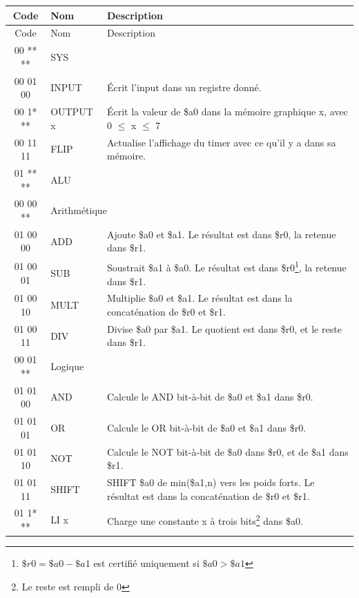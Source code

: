 \documentclass{article}
\begin{document}
\begin{savenotes}
\begin{longtable}{|c|l|l|}
  
  \hline
  Code & Nom & Description \\
  \endfirsthead
  \hline
  Code & Nom & Description \\
  \hline\hline
  \endhead

  \hline\hline
  00 ** ** & \multicolumn{2}{|l|}{SYS} \\
  \hline
  00 01 00 & INPUT    & \'Ecrit l'input dans un registre donné. \\
  00 1* ** & OUTPUT x & \'Ecrit la valeur de \$a0 dans la mémoire graphique x, avec 0 $\leq$ x $\leq$ 7 \\
  00 11 11 & FLIP     & Actualise l'affichage du timer avec ce qu'il y a dans sa mémoire. \\
  
  \hline\hline
  01 ** ** & \multicolumn{2}{|l|}{ALU} \\
  \hline
  00 00 ** & \multicolumn{2}{|l|}{Arithmétique} \\
  \hline
  01 00 00 & ADD   & Ajoute \$a0 et \$a1. Le résultat est dans \$r0, la retenue dans \$r1. \\
  01 00 01 & SUB   & Soustrait \$a1 à \$a0. Le résultat est dans \$r0\footnote{$\$r0=\$a0-\$a1$ est certifié uniquement si $\$a0>\$a1$}, la retenue dans \$r1. \\
  01 00 10 & MULT  & Multiplie \$a0 et \$a1. Le résultat est dans la concaténation de \$r0 et \$r1.\\
  01 00 11 & DIV   & Divise \$a0 par \$a1. Le quotient est dans \$r0, et le reste dans \$r1. \\
  \hline
  00 01 ** & \multicolumn{2}{|l|}{Logique} \\
  \hline
  01 01 00 & AND   & Calcule le AND bit-à-bit de \$a0 et \$a1 dans \$r0. \\
  01 01 01 & OR    & Calcule le OR bit-à-bit de \$a0 et \$a1 dans \$r0. \\
  01 01 10 & NOT   & Calcule le NOT bit-à-bit de \$a0 dans \$r0, et de \$a1 dans \$r1. \\
  01 01 11 & SHIFT & SHIFT \$a0 de min(\$a1,n) vers les poids forts. Le résultat est dans la concaténation de \$r0 et \$r1.\\
  \hline
  01 1* ** & LI x  & Charge une constante x à trois bits\footnote{Le reste est rempli de 0} dans \$a0. \\
  

\end{longtable}
\end{savenotes}
\end{document}
